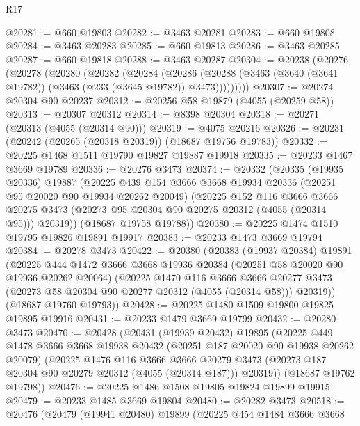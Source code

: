 \begin{lexlean}{R17}
\begin{coremodule}
@20281 := @660 @19803
@20282 := @3463 @20281
@20283 := @660 @19808
@20284 := @3463 @20283
@20285 := @660 @19813
@20286 := @3463 @20285
@20287 := @660 @19818
@20288 := @3463 @20287
@20304 := @20238
    (@20276
      (@20278
        (@20280
          (@20282
            (@20284
              (@20286
                (@20288 (@3463 (@3640 (@3641 @19782)) (@3463 (@233 (@3645 @19782)) @3473)))))))))
@20307 := @20274 @20304 @90 @20237
@20312 := @20256 @58 @19879 (@4055 (@20259 @58))
@20313 := @20307 @20312
@20314 := @8398 @20304
@20318 := @20271 (@20313 (@4055 (@20314 @90)))
@20319 := @4075 @20216
@20326 := @20231 (@20242 (@20265 (@20318 @20319)) (@18687 @19756 @19783))
@20332 := @20225 @1468 @1511 @19790 @19827 @19887 @19918
@20335 := @20233 @1467 @3669 @19789
@20336 := @20276 @3473
@20374 := @20332
    (@20335
      (@19935 @20336)
      @19887
      (@20225
        @439
        @154
        @3666
        @3668
        @19934
        @20336
        (@20251 @95 @20020 @90 @19934 @20262 @20049)
        (@20225
          @152
          @116
          @3666
          @3666
          @20275
          @3473
          (@20273 @95 @20304 @90 @20275 @20312 (@4055 (@20314 @95)))
          @20319))
      (@18687 @19758 @19788))
@20380 := @20225 @1474 @1510 @19795 @19826 @19891 @19917
@20383 := @20233 @1473 @3669 @19794
@20384 := @20278 @3473
@20422 := @20380
    (@20383
      (@19937 @20384)
      @19891
      (@20225
        @444
        @1472
        @3666
        @3668
        @19936
        @20384
        (@20251 @58 @20020 @90 @19936 @20262 @20064)
        (@20225
          @1470
          @116
          @3666
          @3666
          @20277
          @3473
          (@20273 @58 @20304 @90 @20277 @20312 (@4055 (@20314 @58)))
          @20319))
      (@18687 @19760 @19793))
@20428 := @20225 @1480 @1509 @19800 @19825 @19895 @19916
@20431 := @20233 @1479 @3669 @19799
@20432 := @20280 @3473
@20470 := @20428
    (@20431
      (@19939 @20432)
      @19895
      (@20225
        @449
        @1478
        @3666
        @3668
        @19938
        @20432
        (@20251 @187 @20020 @90 @19938 @20262 @20079)
        (@20225
          @1476
          @116
          @3666
          @3666
          @20279
          @3473
          (@20273 @187 @20304 @90 @20279 @20312 (@4055 (@20314 @187)))
          @20319))
      (@18687 @19762 @19798))
@20476 := @20225 @1486 @1508 @19805 @19824 @19899 @19915
@20479 := @20233 @1485 @3669 @19804
@20480 := @20282 @3473
@20518 := @20476
    (@20479
      (@19941 @20480)
      @19899
      (@20225
        @454
        @1484
        @3666
        @3668

\end{coremodule}
\end{lexlean}
